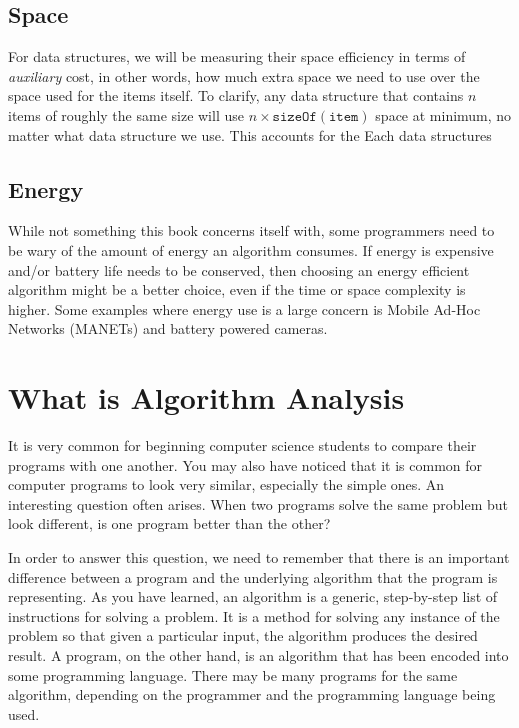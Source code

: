 \subsection{Space}

For data structures, we will be measuring their space efficiency in terms of \textit{auxiliary} cost, in other words, how much extra space we need to use over the space used for the items itself.   To clarify, any data structure that contains $ n $ items of roughly the same size will use $ n \times \mathtt{sizeOf(item)}$ space at minimum, no matter what data structure we use.  This accounts for the 
Each data structures 

\subsection{Energy}
While not something this book concerns itself with, some programmers need to be wary of the amount of energy  an algorithm consumes.  If energy is expensive and/or battery life needs to be conserved, then choosing an energy efficient algorithm might be a better choice, even if the time or space complexity is higher.  Some examples where energy use is a large concern  is Mobile Ad-Hoc Networks (MANETs) and battery powered cameras.




\section{What is Algorithm Analysis}

It is very common for beginning computer science students to compare their programs with one another. You may also have noticed that it is common for computer programs to look very similar, especially the simple ones. An interesting question often arises. When two programs solve the same problem but look different, is one program better than the other? 

In order to answer this question, we need to remember that there is an important difference between a program and the underlying algorithm that the program is representing. As you have learned, an algorithm is a generic, step-by-step list of instructions for solving a problem. It is a method for solving any instance of the problem so that given a particular input, the algorithm produces the desired result. A program, on the other hand, is an algorithm that has been encoded into some programming language. There may be many programs for the same algorithm, depending on the programmer and the programming language being used. 

